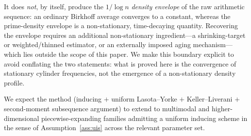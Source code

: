 \documentclass[11pt,a4paper]{article}
\theoremstyle{definition}
\begin{document}
It does \emph{not}, by itself, produce the $1/\log n$ \emph{density
envelope} of the raw arithmetic sequence: an ordinary Birkhoff average
converges to a constant, whereas the prime-density envelope is a
non-stationary, time-decaying quantity. Recovering the envelope requires
an additional non-stationary ingredient---a shrinking-target or
weighted/thinned estimator, or an externally imposed aging mechanism---
which lies outside the scope of this paper. We make this boundary
explicit to avoid conflating the two statements: what is proved here is
the convergence of stationary cylinder frequencies, not the emergence of
a non-stationary density profile.

We expect the method (inducing $+$ uniform Lasota--Yorke $+$
Keller--Liverani $+$ second-moment subsequence argument) to extend to
multimodal and higher-dimensional piecewise-expanding families admitting
a uniform inducing scheme in the sense of Assumption~\ref{ass:uis}
across the relevant parameter set.



\end{document}
